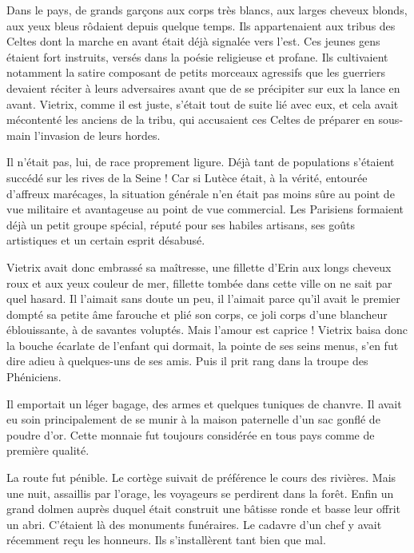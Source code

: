 \documentclass[a4paper, 11pt, oneside, polutonikogreek, french]{article}
\begin{document}
Dans le pays, de grands garçons aux corps très blancs, aux larges cheveux blonds, aux yeux bleus rôdaient depuis quelque temps. Ils appartenaient aux tribus des Celtes dont la marche en avant était déjà signalée vers l'est. Ces jeunes gens étaient fort instruits, versés dans la poésie religieuse et profane. Ils cultivaient notamment la satire composant de petits morceaux agressifs que les guerriers devaient réciter à leurs adversaires avant que de se précipiter sur eux la lance en avant. Vietrix, comme il est juste, s'était tout de suite lié avec eux, et cela avait mécontenté les anciens de la tribu, qui accusaient ces Celtes de préparer en sous-main l'invasion de leurs hordes.

Il n'était pas, lui, de race proprement ligure. Déjà tant de populations s'étaient succédé sur les rives de la Seine ! Car si Lutèce était, à la vérité, entourée d'affreux marécages, la situation générale n'en était pas moins sûre au point de vue militaire et avantageuse au point de vue commercial. Les Parisiens formaient déjà un petit groupe spécial, réputé pour ses habiles artisans, ses goûts artistiques et un certain esprit désabusé.

Vietrix avait donc embrassé sa maîtresse, une fillette d'Erin aux longs cheveux roux et aux yeux couleur de mer, fillette tombée dans cette ville on ne sait par quel hasard. Il l'aimait sans doute un peu, il l'aimait parce qu'il avait le premier dompté sa petite âme farouche et plié son corps, ce joli corps d'une blancheur éblouissante, à de savantes voluptés. Mais l'amour est caprice ! Vietrix baisa donc la bouche écarlate de l'enfant qui dormait, la pointe de ses seins menus, s'en fut dire adieu à quelques-uns de ses amis. Puis il prit rang dans la troupe des Phéniciens.

Il emportait un léger bagage, des armes et quelques tuniques de chanvre. Il avait eu soin principalement de se munir à la maison paternelle d'un sac gonflé de poudre d'or. Cette monnaie fut toujours considérée en tous pays comme de première qualité.

\bigskip
\centerline{\EightStarTaper}
\centerline{\EightStarTaper\EightStarTaper}
\bigskip

La route fut pénible. Le cortège suivait de préférence le cours des rivières. Mais une nuit, assaillis par l'orage, les voyageurs se perdirent dans la forêt. Enfin un grand dolmen auprès duquel était construit une bâtisse ronde et basse leur offrit un abri. C'étaient là des monuments funéraires. Le cadavre d'un chef y avait récemment reçu les honneurs. Ils s'installèrent tant bien que mal.
\end{document}
